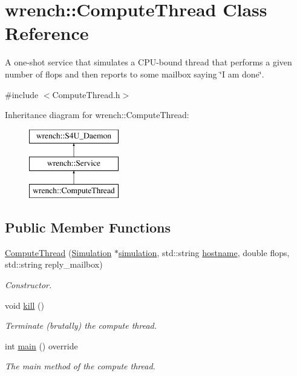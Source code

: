 \hypertarget{classwrench_1_1_compute_thread}{}\section{wrench\+:\+:Compute\+Thread Class Reference}
\label{classwrench_1_1_compute_thread}


A one-\/shot service that simulates a C\+P\+U-\/bound thread that performs a given number of flops and then reports to some mailbox saying \char`\"{}\+I am done\char`\"{}.  




{\ttfamily \#include $<$Compute\+Thread.\+h$>$}

Inheritance diagram for wrench\+:\+:Compute\+Thread\+:\begin{figure}[H]
\begin{center}
\leavevmode
\includegraphics[height=3.000000cm]{classwrench_1_1_compute_thread}
\end{center}
\end{figure}
\subsection*{Public Member Functions}
\begin{DoxyCompactItemize}
\item 
\hyperlink{classwrench_1_1_compute_thread_af258bf21a65a0cf15912171c5e6ec472}{Compute\+Thread} (\hyperlink{classwrench_1_1_simulation}{Simulation} $\ast$\hyperlink{classwrench_1_1_s4_u___daemon_a305beca7ad2fb650ad1492b7c95e93c4}{simulation}, std\+::string \hyperlink{classwrench_1_1_s4_u___daemon_a52bc0b9a6cd248310749dac086819f00}{hostname}, double flops, std\+::string reply\+\_\+mailbox)
\begin{DoxyCompactList}\small\item\em Constructor. \end{DoxyCompactList}\item 
\mbox{\label{classwrench_1_1_compute_thread_a89973c4cd2c9ec39a1d26c05a1bc3b11}} 
void \hyperlink{classwrench_1_1_compute_thread_a89973c4cd2c9ec39a1d26c05a1bc3b11}{kill} ()
\begin{DoxyCompactList}\small\item\em Terminate (brutally) the compute thread. \end{DoxyCompactList}\item 
int \hyperlink{classwrench_1_1_compute_thread_aae43a83a656caf607342b248ee5cde2a}{main} () override
\begin{DoxyCompactList}\small\item\em The main method of the compute thread. \end{DoxyCompactList}\end{DoxyCompactItemize}
